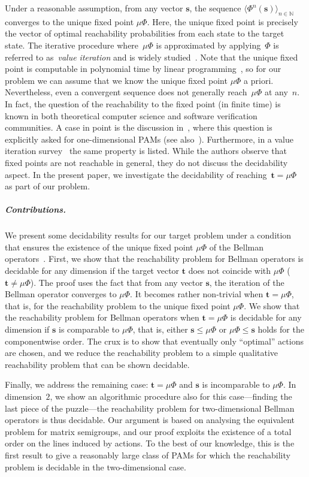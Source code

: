 \documentclass[preprint,12pt]{elsarticle}
\theoremstyle{plain}
\theoremstyle{definition}
\theoremstyle{remark}
\theoremstyle{claimstyle}
\newcommand{\NN}{\mathbb{N}}
\begin{document}
Under a reasonable assumption, from any vector $\bm{s}$, the sequence $\langle\Phi^{n}(\bm{s})\rangle_{n\in \NN}$ converges to the unique fixed point $\mu\Phi$.
Here, the unique fixed point is precisely the vector of optimal reachability probabilities from each state to the target state.
The iterative procedure where~$\mu\Phi$ is approximated by applying~$\Phi$ is referred to as~\emph{value iteration} and is widely studied~\cite{bk,Baier0L0W17,chatterjee2008vi}.
Note that the unique fixed point is computable in polynomial time by linear programming~\cite{bk}, so for our problem we can assume that we know the unique fixed point $\mu\Phi$ a priori. 
Nevertheless, even a convergent sequence does not generally reach~$\mu\Phi$ at any~$n$.
In fact, the question of the reachability to the fixed point (in finite time) is known in both theoretical computer science and software verification communities.
A case in point is the discussion in~\cite{koiran1994pam}, where this question is explicitly asked for one-dimensional PAMs (see also~\cite{blondel2001note}).
Furthermore, in a value iteration survey~\cite{chatterjee2008vi} the same property is listed.
While the authors observe that fixed points are not reachable in general, they do not discuss the decidability aspect.
In the present paper, we investigate the decidability of reaching~$\bm{t} = \mu\Phi$ as part of our problem.

\subparagraph{Contributions.}
We present some decidability results for our target problem under a condition that ensures the existence of the unique fixed point $\mu\Phi$ of the Bellman operators~\cite{HaddadM18}. 
First, we show that the reachability problem for Bellman operators is decidable for any dimension if the target vector $\bm{t}$ does not coincide with $\mu\Phi$ ($\bm{t}\not = \mu\Phi$). 
The proof uses the fact that from any vector $\bm{s}$, the iteration of the Bellman operator converges to $\mu\Phi$.
It becomes rather non-trivial when $\bm{t} = \mu\Phi$, that is, for the reachability problem to the unique fixed point $\mu\Phi$. 
We show that the reachability problem for Bellman operators when $\bm{t} = \mu\Phi$ is decidable for any dimension if $\bm{s}$ is comparable to $\mu\Phi$, that is, either $\bm{s}\leq \mu\Phi$ or $\mu\Phi \leq \bm{s}$ holds for the componentwise order.  
The crux is to show that eventually only ``optimal'' actions are chosen, and we reduce the reachability problem to a simple qualitative reachability problem that can be shown decidable. 

Finally, we address the remaining case: $\bm{t} = \mu\Phi$ and $\bm{s}$ is incomparable to $\mu\Phi$. 
In dimension~$2$, we show an algorithmic procedure also for this case---finding the last piece of the puzzle---the reachability problem for two-dimensional Bellman operators is thus decidable. 
Our argument is based on analysing the equivalent problem for matrix semigroups, and 
our proof exploits 
the existence of a total order on the lines induced by actions.
To the best of our knowledge, this is the first result to give a reasonably large class of PAMs for which the reachability problem is decidable in the two-dimensional case. 
\end{document}
